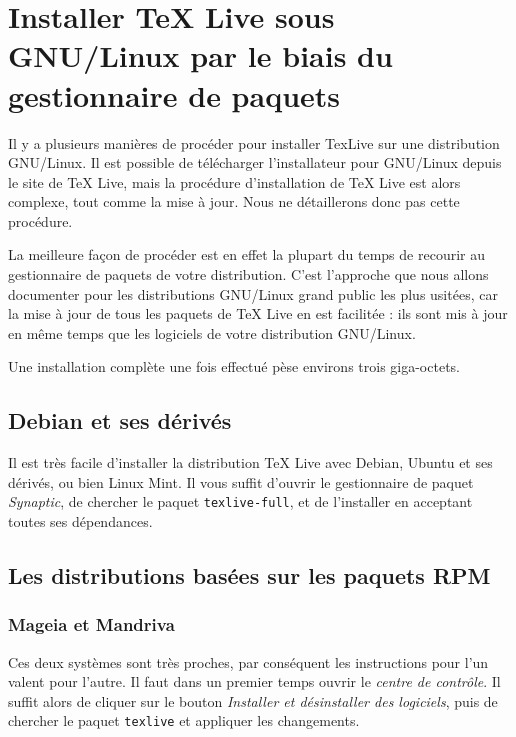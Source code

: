\section{Installer TeX Live sous GNU/Linux par le biais du gestionnaire de paquets}

Il y a plusieurs manières de procéder pour installer TexLive sur une distribution GNU/Linux. Il est possible de télécharger l'installateur pour GNU/Linux depuis le site de TeX Live, mais la procédure d'installation de TeX Live est alors complexe, tout comme la mise à jour. Nous ne détaillerons donc pas cette procédure.

La meilleure façon de procéder est en effet la plupart du temps de recourir au gestionnaire de paquets de votre distribution. C'est l'approche que nous allons documenter pour les distributions GNU/Linux grand public les plus usitées, car la mise à jour de tous les paquets de TeX Live en est facilitée : ils sont mis à jour en même temps que les logiciels de votre distribution GNU/Linux.

Une installation complète une fois effectué pèse environs trois giga-octets.

\subsection{Debian et ses dérivés}

Il est très facile d'installer la distribution TeX Live avec Debian, Ubuntu et ses dérivés, ou bien Linux Mint. Il vous suffit d'ouvrir le gestionnaire de paquet \emph{Synaptic}, de chercher le paquet  \verb|texlive-full|, et de l'installer en acceptant toutes ses dépendances.

\subsection{Les distributions basées sur les paquets RPM}

\subsubsection{Mageia et Mandriva}

Ces deux systèmes sont très proches, par conséquent les instructions pour l'un valent pour l'autre. Il faut dans un premier temps ouvrir le \emph{centre de contrôle}. Il suffit alors de cliquer sur le bouton \emph{Installer et désinstaller des logiciels}, puis de chercher le paquet \verb|texlive| et appliquer les changements. 

